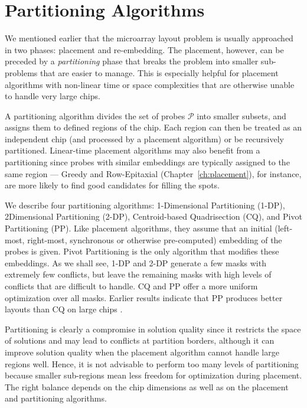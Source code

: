\chapter{Partitioning Algorithms}
\label{ch:part}

We mentioned earlier that the microarray layout problem is usually approached in
two phases: placement and re-embedding. The placement, however, can be preceded
by a \emph{partitioning} phase that breaks the problem into smaller sub-problems
that are easier to manage. This is especially helpful for placement algorithms
with non-linear time or space complexities that are otherwise unable to handle
very large chips.

A partitioning algorithm divides the set of probes $\mathcal{P}$ into smaller
subsets, and assigns them to defined regions of the chip. Each region can then
be treated as an independent chip (and processed by a placement algorithm) or be
recursively partitioned. Linear-time placement algorithms may also benefit from
a partitioning since probes with similar embeddings are typically assigned to
the same region --- Greedy and Row-Epitaxial (Chapter~\ref{ch:placement}), for
instance, are more likely to find good candidates for filling the spots.

We describe four partitioning algorithms: 1-Dimensional Partitioning (1-DP),
2\hyph Dimensional Partitioning (2-DP), Centroid-based Quadrisection (CQ), and
Pivot Partitioning (PP). Like placement algorithms, they assume that an initial
(left-most, right-most, synchronous or otherwise pre-computed) embedding of the
probes is given. Pivot Partitioning is the only algorithm that modifies these
embeddings.  As we shall see, 1-DP and 2-DP generate a few masks with extremely
few conflicts, but leave the remaining masks with high levels of conflicts that
are difficult to handle. CQ and PP offer a more uniform optimization over all
masks. Earlier results indicate that PP produces better layouts than CQ on large
chips \citep{Carvalho2006}.

Partitioning is clearly a compromise in solution quality since it restricts the
space of solutions and may lead to conflicts at partition borders, although it
can improve solution quality when the placement algorithm cannot handle large
regions well. Hence, it is not advisable to perform too many levels of
partitioning because smaller sub-regions mean less freedom for optimization
during placement. The right balance depends on the chip dimensions as well as on
the placement and partitioning algorithms.

